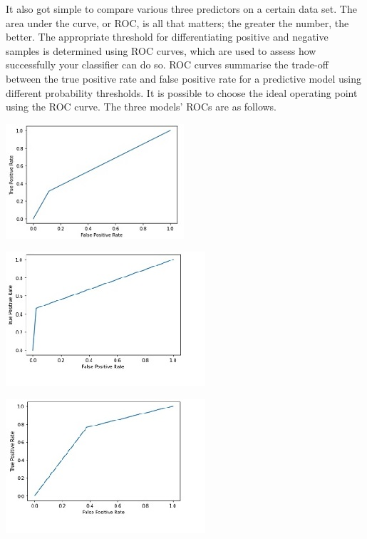 \par It also got simple to compare various three predictors on a certain data set. The area under the curve, or ROC, is all that matters; the greater the number, the better. The appropriate threshold for differentiating positive and negative samples is determined using ROC curves, which are used to assess how successfully your classifier can do so. ROC curves summarise the trade-off between the true positive rate and false positive rate for a predictive model using different probability thresholds. It is possible to choose the ideal operating point using the ROC curve. The three models' ROCs are as follows.
\begin{center}
    \includegraphics[]{rc1.jpg}\\
\end{center}
\begin{center}
     \includegraphics[]{rc2.jpg}\\
\end{center}
\begin{center}
    \includegraphics[]{rc3.jpg}\\
\end{center}
















